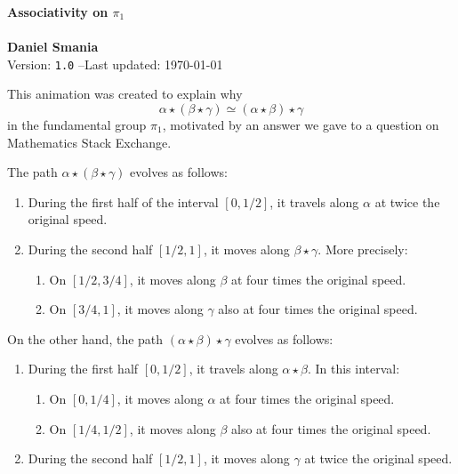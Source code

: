 \documentclass[12pt]{amsart}
\begin{document}
\begin{center}
{\LARGE\bfseries Associativity on $\pi_1$}\\ \ \\  { \LARGE\bfseries Daniel Smania} \\[0.5em]
Version: \texttt{1.0} \quad--\quad Last updated: \today \\

\end{center}
\vspace{1em}

This animation was created to explain why 
$$
\alpha \star (\beta \star \gamma) \simeq (\alpha \star \beta) \star \gamma
$$
in the fundamental group $\pi_1$, motivated by an answer we gave to a question on Mathematics Stack Exchange.

The path $\alpha \star (\beta \star \gamma)$ evolves as follows:
\begin{enumerate}[label=\textbf{\arabic*.}]
    \item During the first half of the interval $[0, 1/2]$, it travels along $\alpha$ at twice the original speed.

    \item During the second half $[1/2, 1]$, it moves along $\beta \star \gamma$. More precisely:
    \begin{enumerate}[label*=\arabic*.]
        \item On $[1/2, 3/4]$, it moves along $\beta$ at four times the original speed.
        \item On $[3/4, 1]$, it moves along $\gamma$ also at four times the original speed.
    \end{enumerate}
\end{enumerate}

On the other hand, the path $(\alpha \star \beta) \star \gamma$ evolves as follows:
\begin{enumerate}[label=\textbf{\arabic*.}]
    \item During the first half $[0, 1/2]$, it travels along $\alpha \star \beta$. In this interval:
    \begin{enumerate}[label*=\arabic*.]
        \item On $[0, 1/4]$, it moves along $\alpha$ at four times the original speed.
        \item On $[1/4, 1/2]$, it moves along $\beta$ also at four times the original speed.
    \end{enumerate}

    \item During the second half $[1/2, 1]$, it moves along $\gamma$ at twice the original speed.
\end{enumerate}
\vspace{1em}
\end{document}
